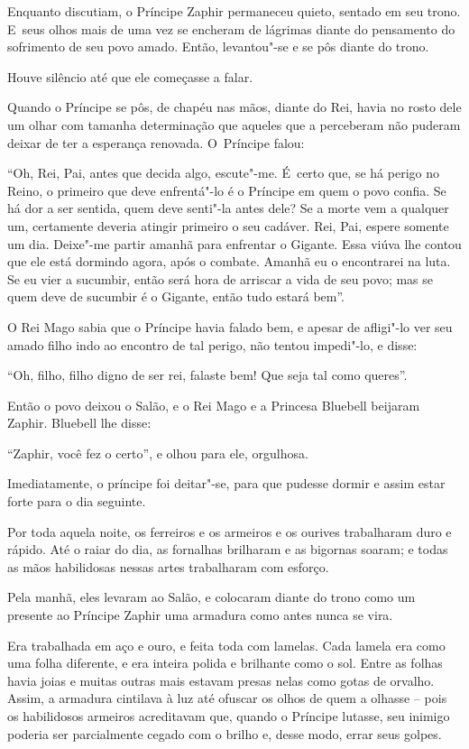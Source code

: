 Enquanto discutiam, o Príncipe Zaphir permaneceu quieto, sentado em seu
trono. E~seus olhos mais de uma vez se encheram de lágrimas diante do
pensamento do sofrimento de seu povo amado. Então, levantou"-se e se pôs
diante do trono.

Houve silêncio até que ele começasse a falar.

Quando o Príncipe se pôs, de chapéu nas mãos, diante do Rei, havia no
rosto dele um olhar com tamanha determinação que aqueles que a
perceberam não puderam deixar de ter a esperança renovada. O~Príncipe
falou:

``Oh, Rei, Pai, antes que decida algo, escute"-me. É~certo que, se há
perigo no Reino, o primeiro que deve enfrentá"-lo é o Príncipe em quem o
povo confia. Se há dor a ser sentida, quem deve senti"-la antes dele? Se
a morte vem a qualquer um, certamente deveria atingir primeiro o seu
cadáver. Rei, Pai, espere somente um dia. Deixe"-me partir amanhã para
enfrentar o Gigante. Essa viúva lhe contou que ele está dormindo agora,
após o combate. Amanhã eu o encontrarei na luta. Se eu vier a sucumbir,
então será hora de arriscar a vida de seu povo; mas se quem deve de
sucumbir é o Gigante, então tudo estará bem''.

O Rei Mago sabia que o Príncipe havia falado bem, e apesar de afligi"-lo
ver seu amado filho indo ao encontro de tal perigo, não tentou
impedi"-lo, e disse:



``Oh, filho, filho digno de ser rei, falaste bem! Que seja tal como
queres''.

Então o povo deixou o Salão, e o Rei Mago e a Princesa Bluebell beijaram
Zaphir. Bluebell lhe disse:

``Zaphir, você fez o certo'', e olhou para ele, orgulhosa.

Imediatamente, o príncipe foi deitar"-se, para que pudesse dormir e assim
estar forte para o dia seguinte.

Por toda aquela noite, os ferreiros e os armeiros e os ourives
trabalharam duro e rápido. Até o raiar do dia, as fornalhas brilharam e
as bigornas soaram; e todas as mãos habilidosas nessas artes trabalharam
com esforço.

Pela manhã, eles levaram ao Salão, e colocaram diante do trono como um
presente ao Príncipe Zaphir uma armadura como antes nunca se vira.

Era trabalhada em aço e ouro, e feita toda com lamelas. Cada lamela era
como uma folha diferente, e era inteira polida e brilhante como o sol.
Entre as folhas havia joias e muitas outras mais estavam presas nelas
como gotas de orvalho. Assim, a armadura cintilava à luz até ofuscar os
olhos de quem a olhasse -- pois os habilidosos armeiros acreditavam que,
quando o Príncipe lutasse, seu inimigo poderia ser parcialmente cegado
com o brilho e, desse modo, errar seus golpes.

